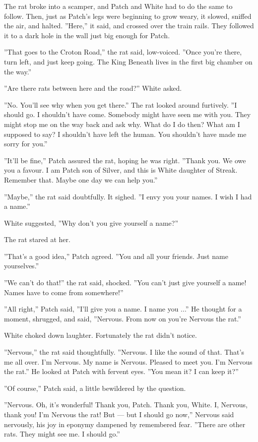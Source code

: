\documentclass[12pt]{book}
\begin{document}
The rat broke into a scamper, and Patch and White had to do the same to follow. Then, just as Patch's legs were beginning to grow weary, it slowed, sniffed the air, and halted. ''Here,'' it said, and crossed over the train rails. They followed it to a dark hole in the wall just big enough for Patch.

''That goes to the Croton Road,'' the rat said, low-voiced. ''Once you're there, turn left, and just keep going. The King Beneath lives in the first big chamber on the way.''

''Are there rats between here and the road?'' White asked.

''No. You'll see why when you get there.'' The rat looked around furtively. ''I should go. I shouldn't have come. Somebody might have seen me with you. They might stop me on the way back and ask why. What do I do then? What am I supposed to say? I shouldn't have left the human. You shouldn't have made me sorry for you.''

''It'll be fine,'' Patch assured the rat, hoping he was right. ''Thank you. We owe you a favour. I am Patch son of Silver, and this is White daughter of Streak. Remember that. Maybe one day we can help you.''

''Maybe,'' the rat said doubtfully. It sighed. ''I envy you your names. I wish I had a name.''

White suggested, ''Why don't you give yourself a name?''

The rat stared at her.

''That's a good idea,'' Patch agreed. ''You and all your friends. Just name yourselves.''

''We can't do that!'' the rat said, shocked. ''You can't just give yourself a name! Names have to come from somewhere!''

''All right,'' Patch said, ''I'll give you a name. I name you ...'' He thought for a moment, shrugged, and said, ''Nervous. From now on you're Nervous the rat.''

White choked down laughter. Fortunately the rat didn't notice.

''Nervous,'' the rat said thoughtfully. ''Nervous. I like the sound of that. That's me all over. I'm Nervous. My name is Nervous. Pleased to meet you. I'm Nervous the rat.'' He looked at Patch with fervent eyes. ''You mean it? I can keep it?''

''Of course,'' Patch said, a little bewildered by the question.

''Nervous. Oh, it's wonderful! Thank you, Patch. Thank you, White. I, Nervous, thank you! I'm Nervous the rat! But ---
but I should go now,'' Nervous said nervously, his joy in eponymy dampened by remembered fear. ''There are other rats. They might see me. I should go.''
\end{document}
